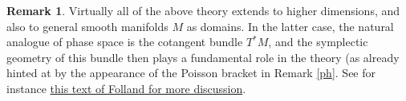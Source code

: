 \documentclass[11pt]{article}
\theoremstyle{definition}
\newtheorem{remark}[theorem]{Remark}
\begin{document}
\begin{remark}
  Virtually all of the above theory extends to higher dimensions, and also to general smooth manifolds \({M}\) as domains. In the latter case, the natural analogue of phase space is the cotangent bundle \({T^* M}\), and the symplectic geometry of this bundle then plays a fundamental role in the theory (as already hinted at by the appearance of the Poisson bracket in Remark \ref{ph}. See for instance \href{https://mathscinet.ams.org/mathscinet-getitem?mr=983366}{this text of Folland for more discussion}. 
\end{remark}
 
\end{document}
